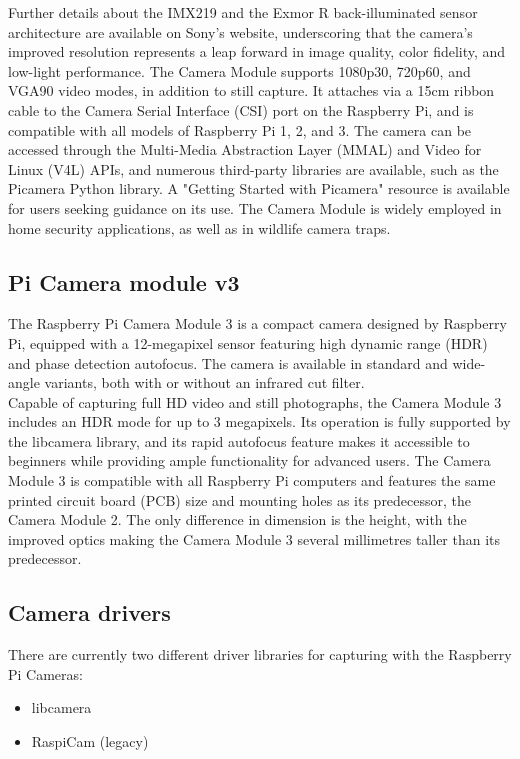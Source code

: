 Further details about the IMX219 and the Exmor R back-illuminated sensor architecture are available on Sony's website, underscoring that the camera's improved resolution represents a leap forward in image quality, color fidelity, and low-light performance. The Camera Module supports 1080p30, 720p60, and VGA90 video modes, in addition to still capture. It attaches via a 15cm ribbon cable to the Camera Serial Interface (CSI) port on the Raspberry Pi, and is compatible with all models of Raspberry Pi 1, 2, and 3. The camera can be accessed through the Multi-Media Abstraction Layer (MMAL) and Video for Linux (V4L) APIs, and numerous third-party libraries are available, such as the Picamera Python library. A "Getting Started with Picamera" resource is available for users seeking guidance on its use. The Camera Module is widely employed in home security applications, as well as in wildlife camera traps.\cite{rpicam2specs}\cite{rpicamspecs}\\


\subsection{Pi Camera module v3}
The Raspberry Pi Camera Module 3 is a compact camera designed by Raspberry Pi, equipped with a 12-megapixel sensor featuring high dynamic range (HDR) and phase detection autofocus. The camera is available in standard and wide-angle variants, both with or without an infrared cut filter.\\

Capable of capturing full HD video and still photographs, the Camera Module 3 includes an HDR mode for up to 3 megapixels. Its operation is fully supported by the libcamera library, and its rapid autofocus feature makes it accessible to beginners while providing ample functionality for advanced users. The Camera Module 3 is compatible with all Raspberry Pi computers and features the same printed circuit board (PCB) size and mounting holes as its predecessor, the Camera Module 2. The only difference in dimension is the height, with the improved optics making the Camera Module 3 several millimetres taller than its predecessor.\cite{rpicam3specs} \\
\fi

\subsection{Camera drivers}
There are currently two different driver libraries for capturing with the Raspberry Pi Cameras:
\begin{itemize}
  \item libcamera \cite{docs-libcamera}
  \item RaspiCam (legacy) \cite{github-raspicam}
\end{itemize}

